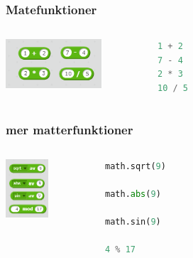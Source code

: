 \documentclass{beamer}
\begin{document}
\begin{frame}[fragile]
	\frametitle{Matefunktioner}
	
	\begin{columns}[c] %
		\begin{center}
			\includegraphics[width=0.7\textwidth]{blocks/oparations.png}
		\end{center}
		\begin{lstlisting}[language=Python]
1 + 2
7 - 4
2 * 3
10 / 5
		\end{lstlisting}
	\end{columns}
\end{frame}

\begin{frame}[fragile]
	\frametitle{mer matterfunktioner}
	
	\begin{columns}[c] %
		\begin{center}
			\includegraphics[width=0.5\textwidth]{blocks/math_oper.png}
		\end{center}
		\begin{lstlisting}[language=Python]
math.sqrt(9)

math.abs(9)

math.sin(9)

4 % 17
		\end{lstlisting}
	\end{columns}
\end{frame}
\end{document}
